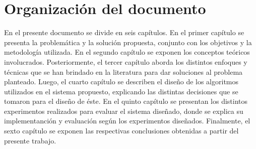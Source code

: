 \section{Organización del documento}
\label{intro:organizacion}
En el presente documento se divide en seis capítulos. En el primer capítulo se presenta la problemática y la solución propuesta, conjunto con los objetivos y la metodología utilizada. En el segundo capítulo se exponen los conceptos teóricos involucrados. Posteriormente, el tercer capítulo aborda los distintos enfoques y técnicas que se han brindado en la literatura para dar soluciones al problema planteado. Luego, el cuarto capítulo se describen el diseño de los algoritmos utilizados en el sistema propuesto, explicando las distintas decisiones que se tomaron para el diseño de éste. En el quinto capítulo se presentan los distintos experimentos realizados para evaluar el sistema diseñado, donde se explica su implementanción y evaluación según los experimentos diseñados. Finalmente, el sexto capítulo se exponen las respectivas conclusiones obtenidas a partir del presente trabajo.